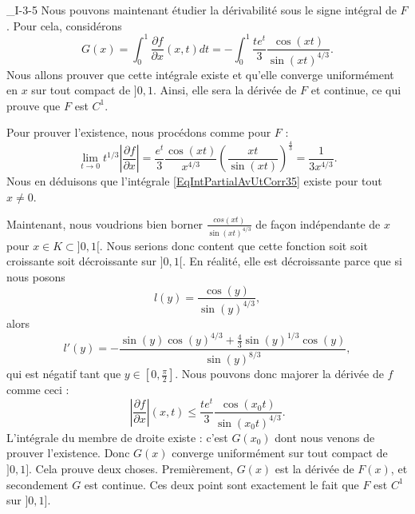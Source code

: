 \begin{corrige}{_I-3-5}
Nous pouvons maintenant étudier la dérivabilité sous le signe intégral de $F$. Pour cela, considérons
\begin{equation}		\label{EqIntPartialAvUtCorr35}
	G(x)=\int_0^1\frac{ \partial f }{ \partial x }(x,t)dt=-\int_0^1\frac{ t e^{t} }{ 3 }\frac{ \cos(xt) }{ \sin(xt)^{4/3} }.
\end{equation}
Nous allons prouver que cette intégrale existe et qu'elle converge uniformément en $x$ sur tout compact de $]0,1$. Ainsi, elle sera la dérivée de $F$ et continue, ce qui prouve que $F$ est $C^1$.

Pour prouver l'existence, nous procédons comme pour $F$ :
\begin{equation}
	\lim_{t\to 0}t^{1/3}\left| \frac{ \partial f }{ \partial x } \right| =\frac{ e^t }{ 3 }\frac{ \cos(xt) }{ x^{4/3} }\left( \frac{ xt }{ \sin(xt) } \right)^{\frac{ 4 }{ 3 }}=\frac{ 1 }{ 3x^{4/3} }.
\end{equation}
Nous en déduisons que l'intégrale \eqref{EqIntPartialAvUtCorr35} existe pour tout $x\neq 0$.

Maintenant, nous voudrions bien borner $\frac{ cos(xt) }{ \sin(xt)^{4/3} }$ de façon indépendante de $x$ pour $x\in K\subset ]0,1[$. Nous serions donc content que cette fonction soit soit croissante soit décroissante sur $]0,1[$. En réalité, elle est décroissante parce que si nous posons
\begin{equation}
		l(y)=\frac{ \cos(y) }{ \sin(y)^{4/3} },
\end{equation}
alors 
\begin{equation}
	l'(y)=-\frac{ \sin(y)\cos(y)^{4/3}+\frac{ 4 }{ 3 }\sin(y)^{1/3}\cos(y) }{ \sin(y)^{8/3} },
\end{equation}
qui est négatif tant que $y\in[0,\frac{ \pi }{ 2 }]$. Nous pouvons donc majorer la dérivée de $f$ comme ceci :
\begin{equation}
	\left| \frac{ \partial f }{ \partial x } \right| (x,t)\leq\frac{ te^t }{ 3 }\frac{ \cos(x_0t) }{ \sin(x_0t)^{4/3} }.
\end{equation}
L'intégrale du membre de droite existe : c'est $G(x_0)$ dont nous venons de prouver l'existence. Donc $G(x)$ converge uniformément sur tout compact de $]0,1]$. Cela prouve deux choses. Premièrement, $G(x)$ est la dérivée de $F(x)$, et secondement $G$ est continue. Ces deux point sont exactement le fait que $F$ est $C^1$ sur $]0,1]$.

\end{corrige}
